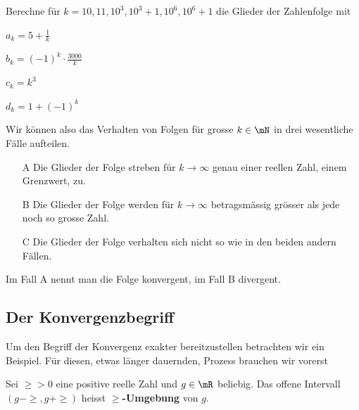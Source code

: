 \documentclass[%
11pt,%
twoside,%
titlepage,%
german,%
headsepline%
]{scrartcl}
\begin{document}
\begin{ueb}
Berechne f\"ur $k=10,11,10^3,10^3+1,10^6,10^6+1$ die Glieder der Zahlenfolge mit

\begin{minipage}{0.3\textwidth}
\begin{enumeratea}
\item $a_k=5+\frac{1}{k}$
\item $b_k=(-1)^k\cdot\frac{3000}{k}$
\end{enumeratea}
\end{minipage}
\begin{minipage}{3.9cm}
\begin{enumeratea}
\addtocounter{enumi}{2}
\item $c_k=k^3$
\item $d_k=1+(-1)^k$
\end{enumeratea}
\end{minipage}
\end{ueb}

Wir k\"onnen also das Verhalten von Folgen f\"ur grosse $k\in\mN$ in drei wesentliche F\"alle aufteilen.
\begin{itemize}
\item[A] Die Glieder der Folge streben f\"ur $k\to\infty$ genau einer reellen Zahl, einem Grenzwert, zu.
\item[B] Die Glieder der Folge werden f\"ur $k\to\infty$ betragsm\"assig gr\"osser als jede noch so grosse Zahl.
\item[C] Die Glieder der Folge verhalten sich nicht so wie in den beiden andern F\"allen.
\end{itemize}
Im Fall A nennt man die Folge konvergent, im Fall B divergent.

\subsection{Der Konvergenzbegriff}

Um den Begriff der Konvergenz exakter bereitzustellen betrachten wir ein Beispiel. F\"ur diesen, etwas l\"anger dauernden, Prozess brauchen wir vorerst

\begin{cdef}[Umgebung]{}
Sei $\ge>0$ eine positive reelle Zahl und $g\in\mR$ beliebig. Das offene Intervall $(g-\ge,g+\ge)$ heisst \textbf{$\ge$-Umgebung} von $g$.
\end{cdef}
\end{document}
